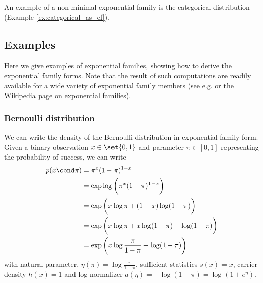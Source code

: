 \documentclass{article} %
\newcommand{\obsScalar}{x}
\newcommand{\logNormalizerFunction}{a}
\newcommand{\sufficientStatsFunctionScalar}{s}
\newcommand{\carrierDensity}{h}
\newcommand{\naturalParamScalar}{\eta}
\begin{document}
  An example of a non-minimal exponential family is the categorical distribution (Example \ref{ex:categorical_as_ef}).

\subsection{Examples}

Here we give examples of exponential families, showing how to derive the exponential family forms.   Note that the result of such computations are readily available for a wide variety of exponential family members (see e.g. \cite{nielsen2009statistical} or the Wikipedia page on exponential families). 

 
\subsubsection{Bernoulli distribution}


\begin{example}
 We can write the density of the Bernoulli distribution in exponential family form. 	 Given a binary observation $\obsScalar \in \set{0,1}$ and  parameter $\pi \in [0,1]$ representing the probability of success, we can write
 \begin{align*}
 p(\obsScalar \cond \pi) &=\pi^{\obsScalar} (1-\pi)^{1-\obsScalar} \\
 &= \exp \log \bigg( \pi^{\obsScalar} (1-\pi)^{1-\obsScalar} \bigg) \\
 &= \exp \bigg( \obsScalar \log \pi +  (1-\obsScalar) \log (1-\pi) \bigg) \\
  &= \exp \bigg( \obsScalar \log \pi +  \obsScalar \log (1-\pi) + \log (1-\pi) \bigg) \\
    &= \exp \bigg( \obsScalar \log \frac{\pi}{1-\pi} + \log (1-\pi) \bigg)
 \end{align*}
%
 with natural parameter, $\naturalParamScalar(\pi) = \log \frac{\pi}{1-\pi}$, sufficient statistics $\sufficientStatsFunctionScalar(\obsScalar) = \obsScalar$, carrier density $\carrierDensity(\obsScalar)=1$ and log normalizer $\logNormalizerFunction(\naturalParamScalar)=-\log (1-\pi)=\log(1+e^{\naturalParamScalar})$.
\label{ex:bernoulli_as_ef}
\end{example}
\end{document}
